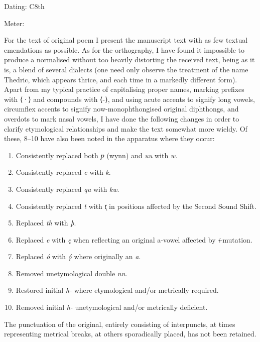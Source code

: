 
\begin{flushright}%
Dating: C8th

Meter: \Fornyrdislag%
\end{flushright}%


For the text of original poem I present the manuscript text with as few textual emendations as possible. As for the orthography, I have found it impossible to produce a normalised without too heavily distorting the received text, being as it is, a blend of several dialects (one need only observe the treatment of the name Thedric, which appears thrice, and each time in a markedly different form). Apart from my typical practice of capitalising proper names, marking prefixes with ⟨·⟩ and compounds with ⟨-⟩, and using acute accents to signify long vowels, circumflex accents to signify now-monophthongised original diphthongs, and overdots to mark nasal vowels, I have done the following changes in order to clarify etymological relationships and make the text somewhat more wieldy. Of these, 8–10 have also been noted in the apparatus where they occur:
\begin{enumerate}
  \item Consistently replaced both \emph{ƿ} (wynn) and \emph{uu} with \emph{w}.
  \item Consistently replaced \emph{c} with \emph{k}.
  \item Consistently replaced \emph{qu} with \emph{kw}.
  \item Consistently replaced \emph{t} with \emph{t̨} in positions affected by the Second Sound Shift.
  \item Replaced \emph{th} with \emph{þ}.
  \item Replaced \emph{e} with \emph{ę} when reflecting an original a-vowel affected by \emph{i}-mutation.
  \item Replaced \emph{ó} with \emph{ǫ́} where originally an \emph{a}.
  \item Removed unetymological double \emph{nn}.
  \item Restored initial \emph{h-} where etymological and/or metrically required.
  \item Removed initial \emph{h-} unetymological and/or metrically deficient.
\end{enumerate}

The punctuation of the original, entirely consisting of interpuncts, at times representing metrical breaks, at others sporadically placed, has not been retained.

